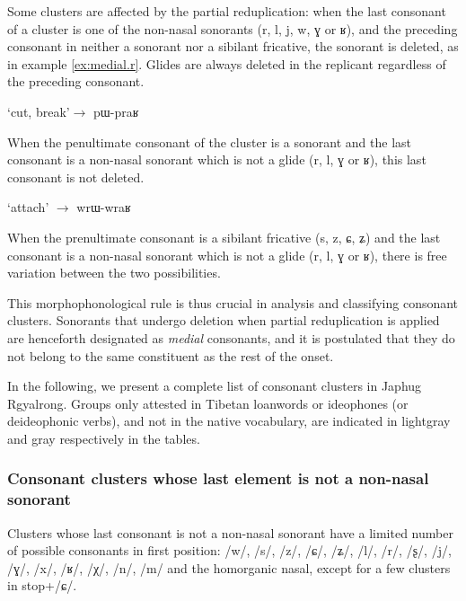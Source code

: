 \documentclass[oldfontcommands,oneside,a4paper,11pt]{article}
\newcommand{\ipa}[1]{{\phon #1}} %
\begin{document}
Some clusters are affected by the partial reduplication:   when the last consonant  of a cluster is one of the non-nasal sonorants (\ipa{r}, \ipa{l}, \ipa{j}, \ipa{w}, \ipa{ɣ} or \ipa{ʁ}), and the preceding consonant in neither a sonorant nor a sibilant fricative, the sonorant is deleted, as in example \ref{ex:medial.r}. Glides are always deleted in the replicant regardless of the preceding consonant.
 
 \begin{exe}
\ex \label{ex:medial.r}
\glt \ipa{praʁ} `cut, break'$\rightarrow$ \ipa{pɯ-praʁ}
\end{exe}

When the penultimate consonant of the cluster is a sonorant   and the last consonant is a non-nasal sonorant which is not a glide (\ipa{r}, \ipa{l}, \ipa{ɣ} or \ipa{ʁ}), this last consonant  is not deleted. 

 \begin{exe}
\ex  \label{ex:initial.r}
\glt \ipa{wraʁ} `attach' $\rightarrow$ \ipa{wrɯ-wraʁ}
\end{exe}
  
When the prenultimate consonant is a sibilant fricative   (\ipa{s}, \ipa{z}, \ipa{ɕ}, \ipa{ʑ}) and the last consonant is a non-nasal sonorant which is not a glide (\ipa{r}, \ipa{l}, \ipa{ɣ} or \ipa{ʁ}), there is   free variation between the two possibilities.

This morphophonological rule is thus crucial in analysis and classifying consonant clusters. Sonorants that undergo deletion when partial reduplication is applied are henceforth designated as \textit{medial} consonants, and it is postulated that they do not belong to the same constituent as the rest of the onset.

In the following, we present a complete list of consonant clusters in Japhug Rgyalrong. Groups only attested in Tibetan loanwords or ideophones (or deideophonic verbs), and not in the native vocabulary, are indicated in lightgray and gray respectively in the tables.
  
  
  \subsubsection{Consonant clusters whose last element is not a non-nasal sonorant}  
Clusters whose last consonant is not a non-nasal sonorant have a limited number of possible consonants in first position: /w/, /s/, /z/, /ɕ/, /ʑ/, /l/, /r/, /ʂ/, /j/, /ɣ/, /x/, /ʁ/, /χ/, /n/, /m/ and the homorganic nasal, except for a few clusters in stop+/ɕ/.
\end{document}
